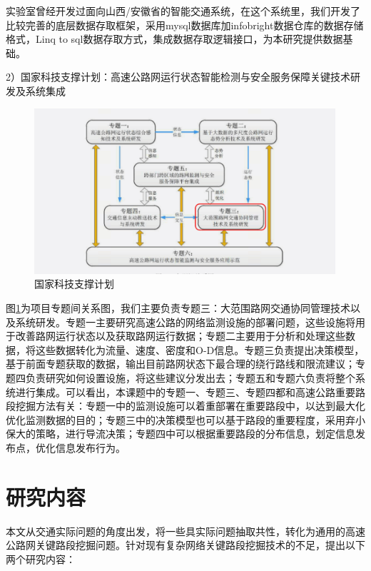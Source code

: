 	实验室曾经开发过面向山西/安徽省的智能交通系统，在这个系统里，我们开发了比较完善的底层数据存取框架，采用mysql数据库加infobright数据仓库的数据存储格式，Linq to sql数据存取方式，集成数据存取逻辑接口，为本研究提供数据基础。

2）国家科技支撑计划：高速公路网运行状态智能检测与安全服务保障关键技术研发及系统集成
	

				\begin{figure}[h]
				\centering
						\begin{minipage}{0.8\linewidth}
							\centering
							\includegraphics[width=4.4in]{picture/zhichengjihua}
							\caption{国家科技支撑计划}
							\label{zhichengjihua}
						\end{minipage}%
				\end{figure}
图\ref{zhichengjihua}为项目专题间关系图，我们主要负责专题三：大范围路网交通协同管理技术以及系统研发。专题一主要研究高速公路的网络监测设施的部署问题，这些设施将用于改善路网运行状态以及获取路网运行数据；专题二主要用于分析和处理这些数据，将这些数据转化为流量、速度、密度和O-D信息。专题三负责提出决策模型，基于前面专题获取的数据，输出目前路网状态下最合理的绕行路线和限流建议；专题四负责研究如何设置设施，将这些建议分发出去；专题五和专题六负责将整个系统进行集成。可以看出，本课题中的专题一、专题三、专题四都和高速公路重要路段挖掘方法有关：专题一中的监测设施可以着重部署在重要路段中，以达到最大化优化监测数据的目的；专题三中的决策模型也可以基于路段的重要程度，采用弃小保大的策略，进行导流决策；专题四中可以根据重要路段的分布信息，划定信息发布点，优化信息发布行为。





\section{研究内容}
    本文从交通实际问题的角度出发，将一些具实际问题抽取共性，转化为通用的高速公路网关键路段挖掘问题。针对现有复杂网络关键路段挖掘技术的不足，提出以下两个研究内容：
    
